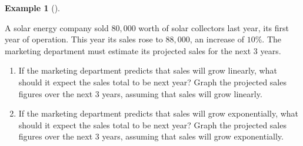 \documentclass[10pt,]{book}
\theoremstyle{plain}
\theoremstyle{definition}
\theoremstyle{definition}
\theoremstyle{definition}
\newtheorem{example}[theorem]{Example}
\theoremstyle{definition}
\theoremstyle{definition}
\numberwithin{equation}{section}
\begin{document}
\begin{example}[]\label{example-compare-linear-vs-exponential}

    A solar energy company sold \textdollar{}\(80,000\) worth of solar collectors last year, its first year of operation. This year its sales rose to \textdollar{}\(88,000\), an increase of \(10\)\%. The marketing department must estimate its projected sales for the next \(3\) years.
    \leavevmode%
\begin{enumerate}[label=*\alph**]
\item\hypertarget{li-650}{}
            If the marketing department predicts that sales will grow linearly, what should it expect the sales total to be next year? Graph the projected sales figures over the next \(3\) years, assuming that sales will grow linearly.
        \item\hypertarget{li-651}{}
            If the marketing department predicts that sales will grow exponentially, what should it expect the sales total to be next year? Graph the projected sales figures over the next \(3\) years, assuming that sales will grow exponentially.
        \end{enumerate}


\end{example}
\end{document}
